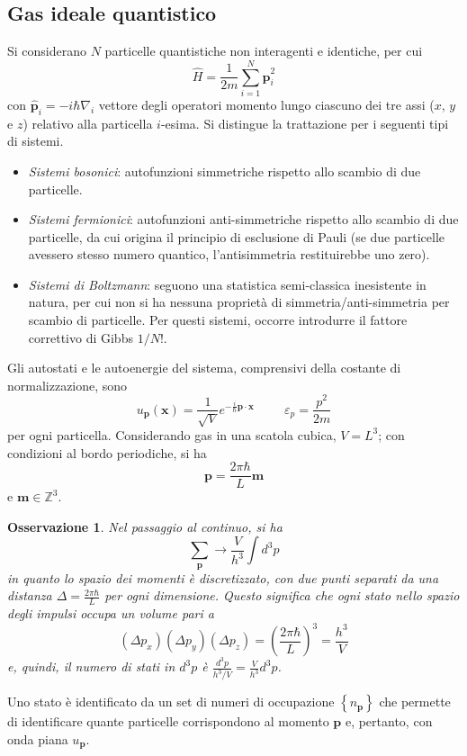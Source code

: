 \documentclass[11pt, a4paper]{scrartcl}
\theoremstyle{style}
\newtheorem{osservazione}{Osservazione}[section]
\theoremstyle{style1}
\numberwithin{equation}{subsection}
\begin{document}
\subsection{Gas ideale quantistico}
Si considerano $N$ particelle quantistiche non interagenti e identiche, per cui
\[
\hat{H} = \frac{1}{2m} \sum_{i=1}^{N} \hat{\mathbf{p} }_i ^2
\] 
con $\hat{\mathbf{p} }_i = - i\hbar \nabla _i$ vettore degli operatori momento lungo ciascuno dei tre assi ($x$, $y$ e $z$) relativo alla particella $i$-esima.
Si distingue la trattazione per i seguenti tipi di sistemi.
\begin{itemize}
	\item \textit{Sistemi bosonici}: autofunzioni simmetriche rispetto allo scambio di due particelle.
	\item \textit{Sistemi fermionici}: autofunzioni anti-simmetriche rispetto allo scambio di due particelle, da cui origina il principio di esclusione di Pauli (se due particelle avessero stesso numero quantico, l'antisimmetria restituirebbe uno zero).
	\item \textit{Sistemi di Boltzmann}: seguono una statistica semi-classica inesistente in natura, per cui non si ha nessuna propriet\`a di simmetria/anti-simmetria per scambio di particelle. 
		Per questi sistemi, occorre introdurre il fattore correttivo di Gibbs $1 / N!$.
\end{itemize}
Gli autostati e le autoenergie del sistema, comprensivi della costante di normalizzazione, sono
\[
u_\mathbf{p}  (\mathbf{x} ) = \frac{1}{\sqrt{V} } e^{- \frac{i}{\hbar } \mathbf{p}  \cdot \mathbf{x} } \hspace{1cm} \varepsilon _p = \frac{p^2}{2m}
\] 
per ogni particella. 
Considerando gas in una scatola cubica, $V=L^3$; con condizioni al bordo periodiche, si ha
\[
\mathbf{p}  = \frac{2 \pi \hbar }{L} \mathbf{m} 
\] 
e $\mathbf{m}  \in \mathbb{Z}^3$.
\begin{osservazione}
Nel passaggio al continuo, si ha
\[
\sum_{\mathbf{p} }^{} \longrightarrow \frac{V}{h^3}\int d^3 p 
\] 
in quanto lo spazio dei momenti \`e discretizzato, con due punti separati da una distanza $\Delta = \frac{2\pi \hbar }{L}$ per ogni dimensione.
Questo significa che ogni stato nello spazio degli impulsi occupa un volume pari a 
\[
	(\Delta p_x ) (\Delta p_y) (\Delta p_z) = \left(\frac{2\pi \hbar }{L}\right) ^3 = \frac{h^3}{V}
\] 
e, quindi, il numero di stati in $d^3p$ \`e $\frac{d^3 p}{h^3 / V} = \frac{V}{h^3}d^3p$.
\end{osservazione}
\noindent Uno stato \`e identificato da un set di numeri di occupazione $\left\{ n_\mathbf{p}  \right\} $ che permette di identificare quante particelle corrispondono al momento $\mathbf{p} $ e, pertanto, con onda piana $u_\textbf{p}$.
\end{document}
